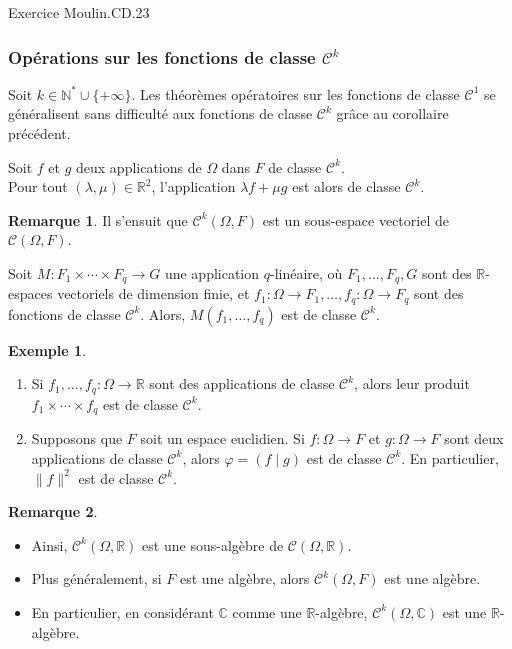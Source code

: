 \documentclass[french]{article}
\newcommand{\N}{\mathbb{N}}
\newcommand{\R}{\mathbb{R}}
\newcommand{\C}{\mathbb{C}}
\newcommand{\st}{^*}
\theoremstyle{plain}
\theoremstyle{definition}
\newtheorem*{ex}{Exemple}
\newtheorem*{rmq}{Remarque}
\theoremstyle{remark}
\begin{document}
Exercice Moulin.CD.23

\subsubsection*{Opérations sur les fonctions de classe $\mathcal{C}^k$}

Soit $k\in\N\st\cup\{+\infty\}$. Les théorèmes opératoires sur les fonctions de classe $\mathcal{C}^1$ se généralisent sans difficulté aux fonctions de classe $\mathcal{C}^k$ grâce au corollaire précédent.

\begin{prop}%
	Soit $f$ et $g$ deux applications de $\Omega$ dans $F$ de classe $\mathcal{C}^k$. \\
	Pour tout $(\lambda,\mu)\in\R^2$, l'application $\lambda f+\mu g$ est alors de classe $\mathcal{C}^k$.
\end{prop}

\begin{rmq}
	Il s'ensuit que $\mathcal{C}^k(\Omega,F)$ est un sous-espace vectoriel de $\mathcal{C}(\Omega,F)$.
\end{rmq}

\begin{prop}%
	Soit $M:F_1\times\cdots\times F_q\to G$ une application $q$-linéaire, où $F_1,\ldots,F_q,G$ sont des $\R$-espaces vectoriels de dimension finie, et $f_1:\Omega\to F_1,\ldots,f_q:\Omega\to F_q$ sont des fonctions de classe $\mathcal{C}^k$. Alors, $M(f_1,\ldots,f_q)$ est de classe $\mathcal{C}^k$.
\end{prop}

\begin{ex}
	\begin{enumerate}
		\item Si $f_1,\ldots,f_q:\Omega\to\R$ sont des applications de classe $\mathcal{C}^k$, alors leur produit $f_1\times\cdots\times f_q$ est de classe $\mathcal{C}^k$.
		\item Supposons que $F$ soit un espace euclidien. Si $f:\Omega\to F$ et $g:\Omega\to F$ sont deux applications de classe $\mathcal{C}^k$, alors $\varphi=(f\mid g)$ est de classe $\mathcal{C}^k$. En particulier, $\lVert f\rVert^2$ est de classe $\mathcal{C}^k$.
	\end{enumerate}
\end{ex}

\begin{rmq}
	\begin{itemize}
		\item Ainsi, $\mathcal{C}^k(\Omega,\R)$ est une sous-algèbre de $\mathcal{C}(\Omega,\R)$.
		\item Plus généralement, si $F$ est une algèbre, alors $\mathcal{C}^k(\Omega,F)$ est une algèbre.
		\item En particulier, en considérant $\C$ comme une $\R$-algèbre, $\mathcal{C}^k(\Omega,\C)$ est une $\R$-algèbre.
	\end{itemize}
\end{rmq}
\end{document}
